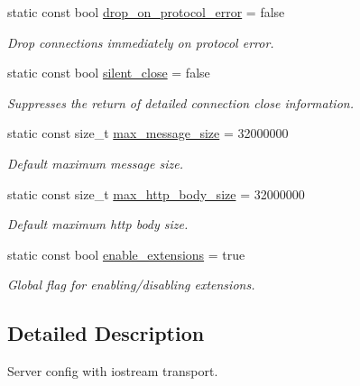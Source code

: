 \begin{DoxyCompactItemize}
\item 
static const bool \hyperlink{structwebsocketpp_1_1config_1_1core_aa103c2e42ba4c43a34e918048b478890}{drop\+\_\+on\+\_\+protocol\+\_\+error} = false
\begin{DoxyCompactList}\small\item\em Drop connections immediately on protocol error. \end{DoxyCompactList}\item 
static const bool \hyperlink{structwebsocketpp_1_1config_1_1core_acb5ef1d40ae50ab2443837270d715f53}{silent\+\_\+close} = false
\begin{DoxyCompactList}\small\item\em Suppresses the return of detailed connection close information. \end{DoxyCompactList}\item 
static const size\+\_\+t \hyperlink{structwebsocketpp_1_1config_1_1core_a54875ed41a1d11149c684f9467b2e0d5}{max\+\_\+message\+\_\+size} = 32000000
\begin{DoxyCompactList}\small\item\em Default maximum message size. \end{DoxyCompactList}\item 
static const size\+\_\+t \hyperlink{structwebsocketpp_1_1config_1_1core_a4836b30dbc83db465f44aabae4e8ef55}{max\+\_\+http\+\_\+body\+\_\+size} = 32000000
\begin{DoxyCompactList}\small\item\em Default maximum http body size. \end{DoxyCompactList}\item 
static const bool \hyperlink{structwebsocketpp_1_1config_1_1core_af2944a777c23010137c55fdfcfb8c352}{enable\+\_\+extensions} = true\hypertarget{structwebsocketpp_1_1config_1_1core_af2944a777c23010137c55fdfcfb8c352}{}\label{structwebsocketpp_1_1config_1_1core_af2944a777c23010137c55fdfcfb8c352}

\begin{DoxyCompactList}\small\item\em Global flag for enabling/disabling extensions. \end{DoxyCompactList}\end{DoxyCompactItemize}


\subsection{Detailed Description}
Server config with iostream transport. 


